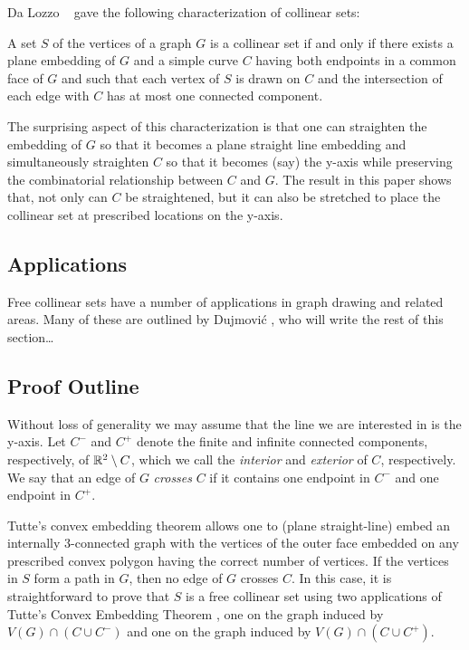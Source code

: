 \documentclass{patmorin}
\begin{document}
Da Lozzo \etal\ \cite{dalozzo.dujmovic.ea:drawing} gave the following
characterization of collinear sets:
\begin{thm}
   A set $S$ of the vertices of a graph $G$ is a collinear set if and
   only if there exists a plane embedding of $G$ and a simple curve
   $C$ having both endpoints in a common face of $G$ and such that each
   vertex of $S$ is drawn on $C$ and the intersection of each edge with
   $C$ has at most one connected component.
\end{thm}
The surprising aspect of this characterization is that one can straighten
the embedding of $G$ so that it becomes a plane straight line embedding
and simultaneously straighten $C$ so that it becomes (say) the y-axis
while preserving the combinatorial relationship between $C$ and $G$. The
result in this paper shows that, not only can $C$ be straightened,
but it can also be stretched to place the collinear set at prescribed
locations on the y-axis.

\subsection{Applications}

Free collinear sets have a number of applications in graph drawing
and related areas.  Many of these are outlined by Dujmovi\'c
\cite{dujmovic:utility}, who will write the rest of this section\ldots



\subsection{Proof Outline}

Without loss of generality we may assume that the line we are interested
in is the y-axis.  Let $C^-$ and $C^+$ denote the finite and infinite
connected components, respectively, of $\mathbb{R}^2\setminus C$, which we call
the \emph{interior} and \emph{exterior} of $C$, respectively.  We say
that an edge of $G$ \emph{crosses} $C$ if it contains one endpoint in
$C^-$ and one endpoint in $C^+$.

Tutte's convex embedding theorem \cite{tutte:how} allows one to (plane
straight-line) embed an internally 3-connected graph with the vertices
of the outer face embedded on any prescribed convex polygon having the
correct number of vertices.  If the vertices in $S$ form a path in $G$,
then no edge of $G$ crosses $C$. In this case, it is straightforward to
prove that $S$ is a free collinear set using two applications of Tutte's
Convex Embedding Theorem \cite{tutte:how}, one on the graph induced by
$V(G)\cap(C\cup C^-)$ and one on the graph induced by $V(G)\cap(C\cup
C^+)$.
\end{document}
